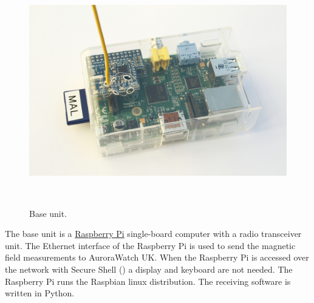 \begin{figure}
  \centering
  \includegraphics[keepaspectratio,height=10cm]{images/base-unit}
  \caption[Base unit]{%
    Base unit. }
  \label{fig:base-unit}
\end{figure}

The base unit is a \href{http://www.raspberrypi.org/‎}{Raspberry Pi}
single-board computer with a radio transceiver unit. The Ethernet
interface of the Raspberry Pi is used to send the magnetic field
measurements to AuroraWatch UK. When the Raspberry Pi is accessed over
the network with Secure Shell (\ssh) a display and keyboard are not
needed. The Raspberry Pi runs the Raspbian linux distribution. The
receiving software is written in Python.

